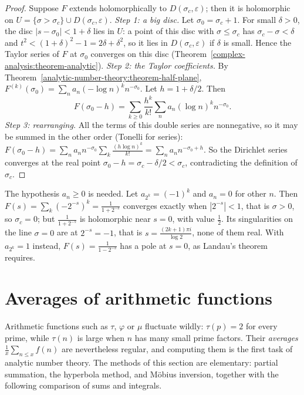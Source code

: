\begin{proof}
Suppose $F$ extends holomorphically to $D(\sigma_c, \varepsilon)$; then it is holomorphic on $U = \{\sigma > \sigma_c\} \cup D(\sigma_c, \varepsilon)$.
\emph{Step 1: a big disc.} Let $\sigma_0 = \sigma_c + 1$. For small $\delta > 0$, the disc $|s - \sigma_0| < 1 + \delta$ lies in $U$: a point of this disc with $\sigma \leq \sigma_c$ has
$\sigma_c - \sigma < \delta$ and $t^2 < (1 + \delta)^2 - 1 = 2\delta + \delta^2$, so it lies in $D(\sigma_c, \varepsilon)$ if $\delta$ is small. Hence the Taylor series of $F$ at $\sigma_0$ converges on this
disc (Theorem~\ref{complex-analysis:theorem-analytic}).
\emph{Step 2: the Taylor coefficients.} By Theorem~\ref{analytic-number-theory:theorem-half-plane}, $F^{(k)}(\sigma_0) = \sum_na_n(-\log n)^kn^{-\sigma_0}$. Let $h = 1 + \delta/2$. Then
\[
F(\sigma_0 - h) = \sum_{k \geq 0}\frac{h^k}{k!}\sum_na_n(\log n)^kn^{-\sigma_0}.
\]
\emph{Step 3: rearranging.} All the terms of this double series are nonnegative, so it may be summed in the other order (Tonelli for series):
$F(\sigma_0 - h) = \sum_na_nn^{-\sigma_0}\sum_k\frac{(h\log n)^k}{k!} = \sum_na_nn^{-\sigma_0 + h}$. So the Dirichlet series converges at the real point $\sigma_0 - h = \sigma_c - \delta/2 < \sigma_c$,
contradicting the definition of $\sigma_c$.
\end{proof}

\begin{counterexample}\label{analytic-number-theory:counterexample-landau}
The hypothesis $a_n \geq 0$ is needed. Let $a_{2^k} = (-1)^k$ and $a_n = 0$ for other $n$. Then $F(s) = \sum_k(-2^{-s})^k = \frac{1}{1 + 2^{-s}}$ converges exactly when $|2^{-s}| < 1$, that is
$\sigma > 0$, so $\sigma_c = 0$; but $\frac{1}{1 + 2^{-s}}$ is holomorphic near $s = 0$, with value $\frac12$. Its singularities on the line $\sigma = 0$ are at $2^{-s} = -1$, that is
$s = \frac{(2k + 1)\pi i}{\log 2}$, none of them real. With $a_{2^k} = 1$ instead, $F(s) = \frac{1}{1 - 2^{-s}}$ has a pole at $s = 0$, as Landau's theorem requires.
\end{counterexample}

\section{Averages of arithmetic functions}\label{analytic-number-theory:section-averages}

Arithmetic functions such as $\tau$, $\varphi$ or $\mu$ fluctuate wildly: $\tau(p) = 2$ for every prime, while $\tau(n)$ is large when $n$ has many small prime factors. Their \emph{averages}
$\frac1x\sum_{n \leq x}f(n)$ are nevertheless regular, and computing them is the first task of analytic number theory. The methods of this section are elementary: partial summation, the hyperbola
method, and Möbius inversion, together with the following comparison of sums and integrals.

